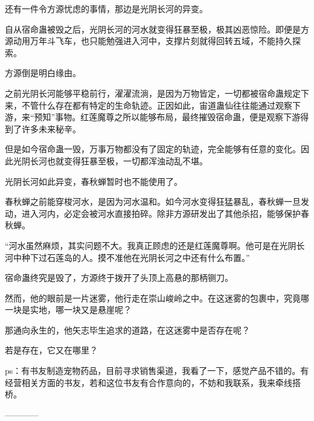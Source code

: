 \begin{this_body}
还有一件令方源忧虑的事情，那边是光阴长河的异变。

自从宿命蛊被毁之后，光阴长河的河水就变得狂暴至极，极其凶恶惊险。即便是方源动用万年斗飞车，也只能勉强进入河中，支撑片刻就得回转五域，不能持久探索。

方源倒是明白缘由。

之前光阴长河能够平稳前行，濯濯流淌，是因为万物皆定，一切都被宿命蛊规定下来，不管什么存在都有特定的生命轨迹。正因如此，宙道蛊仙往往能通过观察下游，来“预知”事物。红莲魔尊之所以能够布局，最终摧毁宿命蛊，便是观察下游得到了许多未来秘辛。

但是如今宿命蛊一毁，万事万物都没有了固定的轨迹，完全能够有任意的变化。因此光阴长河也就变得狂暴至极，一切都浑浊动乱不堪。

光阴长河如此异变，春秋蝉暂时也不能使用了。

春秋蝉之前能穿梭河水，是因为河水温和。如今河水变得狂猛暴乱，春秋蝉一旦发动，进入河内，必定会被河水直接拍碎。除非方源研发出了其他杀招，能够保护春秋蝉。

“河水虽然麻烦，其实问题不大。我真正顾虑的还是红莲魔尊啊。他可是在光阴长河中种下过石莲岛的人。摸不准他在光阴长河之中还有什么布置。”

宿命蛊终究是毁了，方源终于拨开了头顶上高悬的那柄铡刀。

然而，他的眼前是一片迷雾，他行走在崇山峻岭之中。在这迷雾的包裹中，究竟哪一块是实地，哪一块又是悬崖呢？

那通向永生的，他矢志毕生追求的道路，在这迷雾中是否存在呢？

若是存在，它又在哪里？

ps：有书友制造宠物药品，目前寻求销售渠道，我看了一下，感觉产品不错的。有经营相关方面的书友，若和这位书友有合作意向的，不妨和我联系，我来牵线搭桥。

------------

\end{this_body}

